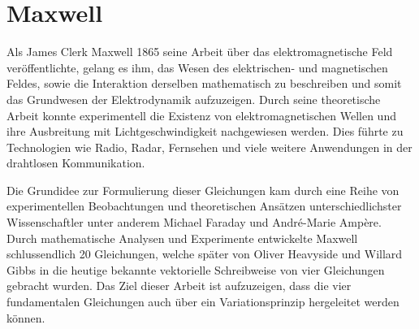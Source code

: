 %
%
%
%

\chapter{Maxwell\label{chapter:maxwell}}
\begin{refsection}

Als James Clerk Maxwell 1865 seine Arbeit über das elektromagnetische Feld veröffentlichte, gelang es ihm, das Wesen des elektrischen- und magnetischen Feldes, sowie die Interaktion derselben mathematisch zu beschreiben und somit das Grundwesen der Elektrodynamik aufzuzeigen.
Durch seine theoretische Arbeit konnte experimentell die Existenz von elektromagnetischen Wellen und ihre Ausbreitung mit Lichtgeschwindigkeit nachgewiesen werden.
Dies führte zu Technologien wie Radio, Radar, Fernsehen und viele weitere Anwendungen in der drahtlosen Kommunikation.

Die Grundidee zur Formulierung dieser Gleichungen kam durch eine Reihe von experimentellen Beobachtungen und theoretischen Ansätzen unterschiedlichster Wissenschaftler unter anderem Michael Faraday und André-Marie Ampère.
Durch mathematische Analysen und Experimente entwickelte Maxwell schlussendlich 20 Gleichungen, welche später von Oliver Heavyside und Willard Gibbs in die heutige bekannte vektorielle Schreibweise von vier Gleichungen gebracht wurden.
Das Ziel dieser Arbeit ist aufzuzeigen, dass die vier fundamentalen Gleichungen  auch über ein Variationsprinzip hergeleitet werden können.






%
%
%
%


\printbibliography[heading=subbibliography]

\end{refsection}

